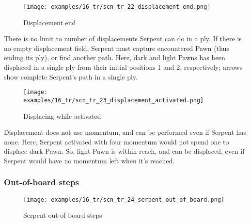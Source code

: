 \vspace*{5.1\baselineskip}

\noindent
\begin{wrapfigure}[11]{l}{0.4\textwidth}
\centering
\texttt{[image: examples/16\_tr/scn\_tr\_22\_displacement\_end.png]}
\vspace*{-0.5\baselineskip}
\caption{Displacement end}
\label{fig:scn_tr_22_displacement_end}
\end{wrapfigure}
\indent
There is no limit to number of displacements Serpent can do in a ply. If there is no
empty displacement field, Serpent must capture encountered Pawn (thus ending its ply),
or find another path. \newline
\indent
Here, dark and light Pawns has been displaced in a single ply from their initial positions
1 and 2, respectively; arrows show complete Serpent's path in a single ply.

\noindent
\begin{wrapfigure}[11]{l}{0.4\textwidth}
\centering
\texttt{[image: examples/16\_tr/scn\_tr\_23\_displacement\_activated.png]}
\vspace*{-0.5\baselineskip}
\caption{Displacing while activated}
\label{fig:scn_tr_23_displacement_activated}
\end{wrapfigure}
Displacement does not use momentum, and can be performed even if Serpent has none. \newline
\indent
Here, Serpent activated with four momentum would not spend one to displace dark
Pawn. So, light Pawn is within reach, and can be displaced, even if Serpent would
have no momentum left when it's reached.

\clearpage %

\subsubsection*{Out-of-board steps}
\label{sec:Tamoanchan Revisited/Serpent/Movement/Out-of-board steps}

\vspace*{-1.0\baselineskip}
\noindent
\begin{figure}[!h]
\texttt{[image: examples/16\_tr/scn\_tr\_24\_serpent\_out\_of\_board.png]}
\caption{Serpent out-of-board steps}
\label{fig:scn_tr_24_serpent_out_of_board}
\end{figure}

